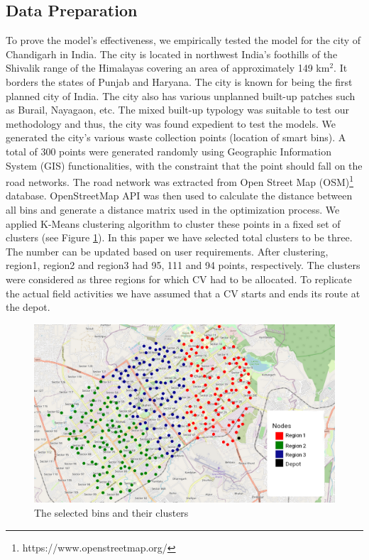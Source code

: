 \documentclass[12pt]{article}
\begin{document}
\subsection{Data Preparation}
To prove the model's effectiveness, we empirically tested the model for the city of Chandigarh in India. The city is located in northwest India's foothills of the Shivalik range of the Himalayas covering an area of approximately 149 km$^2$. It borders the states of Punjab and Haryana. The city is known for being the first planned city of India. The city also has various unplanned built-up patches such as Burail, Nayagaon, etc. The mixed built-up typology was suitable to test our methodology and thus, the city was found expedient to test the models. We generated the city's various waste collection points (location of smart bins). A total of 300 points were generated randomly using Geographic Information System (GIS) functionalities, with the constraint that the point should fall on the road networks. The road network was extracted from Open Street Map (OSM)\footnote{https://www.openstreetmap.org/} database. OpenStreetMap API was then used to calculate the distance between all bins and generate a distance matrix used in the optimization process. We applied K-Means clustering algorithm to cluster these points in a fixed set of clusters (see Figure \ref{figm}). In this paper we have selected total clusters to be three. The number can be updated based on user requirements. After clustering, region1, region2 and region3 had 95, 111 and 94 points, respectively. The clusters were considered as three regions for which CV had to be allocated. To replicate the actual field activities we have assumed that a CV starts and ends its route at the depot.


\begin{figure}[H]
    \centering
    \includegraphics[scale=0.5]{Nodes.png}
    \caption{The selected bins and their clusters}\label{figm}
\end{figure}
\end{document}
